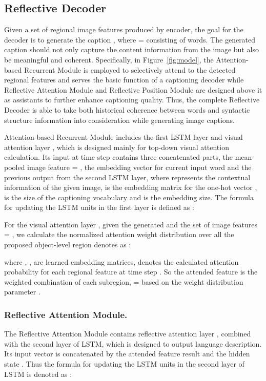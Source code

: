 \documentclass[10pt,twocolumn,letterpaper]{article}
\begin{document}
\subsection{Reflective Decoder}
\label{sec:decoder} 
Given a set of regional image features  produced by encoder, the goal for the decoder is to generate the caption , where  =  consisting of  words. 
The generated caption should not only capture the content information from the image but also be meaningful and coherent.
Specifically, in Figure~\ref{fig:model}, the Attention-based Recurrent Module is employed to selectively attend to the detected regional features and serves the basic function of a captioning decoder while Reflective Attention Module and Reflective Position Module are designed above it as assistants to further enhance captioning quality.
Thus, the complete Reflective Decoder is able to take both historical coherence between words and syntactic structure information into consideration while generating image captions.


Attention-based Recurrent Module includes the first LSTM layer and visual attention layer , which is designed mainly for top-down visual attention calculation. 
Its input  at time step  contains three concatenated parts, the mean-pooled image feature   = , the embedding vector  for current input word  and the previous output  from the second LSTM layer, where  represents the contextual information of the given image,  is the embedding matrix for the one-hot vector ,  is the size of the captioning vocabulary and  is the embedding size.
The formula for updating the LSTM units in the first layer is defined as :

For the visual attention layer , given the generated  and the set of  image features  = , we calculate the normalized attention weight  distribution over all the proposed object-level region denotes as :


where   ,   ,   are learned embedding matrices,  denotes the calculated attention probability for each regional feature  at time step .
So the attended feature is the weighted combination of each subregion,  =  based on the weight distribution parameter .
\vspace{-3mm}
\subsubsection{Reflective Attention Module.}
\label{sec:attention_module} 
The Reflective Attention Module contains reflective attention layer , combined with the second layer of LSTM, which is designed to output language description. 
Its input vector is concatenated by the attended feature result  and the hidden state  .
Thus the formula for updating the LSTM units in the second layer of LSTM is denoted as :
\end{document}
